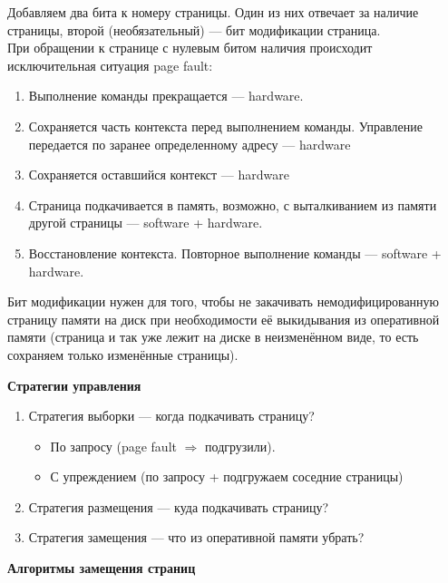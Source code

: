 \documentclass[12pt, a4paper]{article}
\begin{document}
    Добавляем два бита к номеру страницы. Один из них отвечает за наличие страницы, второй (необязательный) --- бит модификации страница.\\
    При обращении к странице с нулевым битом наличия происходит исключительная ситуация page fault:
    \begin{enumerate}
        \item Выполнение команды прекращается --- hardware.
        \item Сохраняется часть контекста перед выполнением команды. Управление передается по заранее определенному адресу --- hardware
        \item Сохраняется оставшийся контекст --- hardware
        \item Страница подкачивается в память, возможно, с выталкиванием из памяти другой страницы --- software + hardware.
        \item Восстановление контекста. Повторное выполнение команды --- software + hardware.
    \end{enumerate}
    Бит модификации нужен для того, чтобы не закачивать немодифицированную страницу памяти на диск при необходимости её выкидывания из оперативной памяти (страница и так уже лежит на диске в неизменённом виде, то есть сохраняем только изменённые страницы).
    \begin{center}
        \bf Стратегии управления
    \end{center}
    \begin{enumerate}
        \item Стратегия выборки --- когда подкачивать страницу?
        \begin{itemize}
            \item По запросу (page fault $\Rightarrow$ подгрузили).
            \item С упреждением (по запросу + подгружаем соседние страницы)
        \end{itemize}
        \item Стратегия размещения --- куда подкачивать страницу?
        \item Стратегия замещения --- что из оперативной памяти убрать?
    \end{enumerate}
    \begin{center}
        \bf Алгоритмы замещения страниц
    \end{center}
\end{document}
